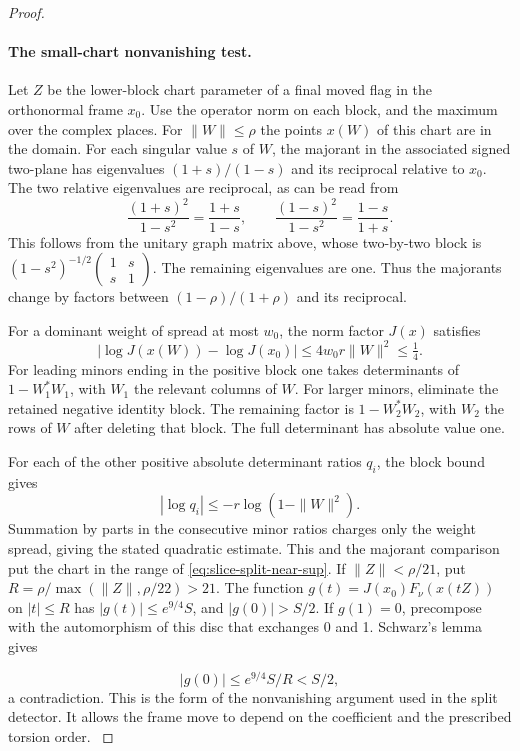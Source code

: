 \begin{proof}
\paragraph{The small-chart nonvanishing test.}
Let \(Z\) be the lower-block chart parameter of a final moved
flag in the orthonormal frame \(x_0\). Use the operator norm on
each block, and the maximum over the complex places. For
\(\|W\|\le\rho\) the points \(x(W)\) of this chart are in the
domain. For each singular value \(s\) of \(W\), the majorant in the
associated signed two-plane has eigenvalues \((1+s)/(1-s)\)
and its reciprocal relative to \(x_0\).
The two relative eigenvalues are reciprocal, as can be read from
\[
  \frac{(1+s)^2}{1-s^2}=\frac{1+s}{1-s},\qquad \frac{(1-s)^2}{1-s^2}=\frac{1-s}{1+s}.
\]
 This follows from the
unitary graph matrix above, whose two-by-two block is
\((1-s^2)^{-1/2}\left(\begin{smallmatrix}1&s\\s&1\end{smallmatrix}\right)\).
The remaining eigenvalues are one. Thus the majorants change by
factors between \((1-\rho)/(1+\rho)\) and its reciprocal.

For a dominant weight
of spread at most \(w_0\), the norm factor \(J(x)\) satisfies
\[
  |\log J(x(W))-\log J(x_0)|\le 4w_0 r\|W\|^2\le \tfrac14 .
\]
For leading minors ending in the positive block one takes
determinants of \(1-W_1^*W_1\), with \(W_1\) the relevant columns
of \(W\). For larger minors, eliminate the retained negative
identity block. The remaining factor is \(1-W_2^*W_2\), with
\(W_2\) the rows of \(W\) after deleting that block. The full
determinant has absolute value one.

For each of the other positive absolute determinant ratios \(q_i\), the block bound gives
\[
  |\log q_i|\le-r\log(1-\|W\|^2).
\]
Summation by parts in the consecutive minor ratios charges
only the weight spread, giving the stated quadratic estimate.
This and the majorant comparison put the chart in the range of
\eqref{eq:slice-split-near-sup}. If \(\|Z\|<\rho/21\), put
\(R=\rho/\max(\|Z\|,\rho/22)>21\).
The function \(g(t)=J(x_0)F_\nu(x(tZ))\) on \(|t|\le R\)
has \(|g(t)|\le e^{9/4}S\), and \(|g(0)|>S/2\).
If \(g(1)=0\), precompose with the automorphism of this disc
that exchanges 0 and 1. Schwarz's lemma gives

\[
  |g(0)|\le e^{9/4}S/R<S/2,
\]
 a contradiction.
This is the form of the nonvanishing argument used in the split
detector. It allows the frame move to depend on the coefficient
and the prescribed torsion order.
\label{cor:slice-split-frame-3}
\end{proof}

